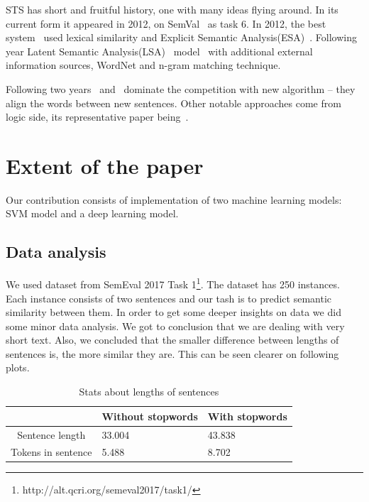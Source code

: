 \documentclass[10pt, a4paper]{article}
\begin{document}
STS has short and fruitful history, one with many ideas flying around. In its current form it appeared in 2012, on SemVal~\citep{agirre2012semeval} as task 6.  In 2012, the best system~\citep{bar2012ukp} used lexical similarity and Explicit Semantic Analysis(ESA)~\citep{gabrilovich2007computing}. Following year Latent Semantic Analysis(LSA)~\citep{deerwester1990indexing} model~\citep{han2013umbc} with additional external information sources, WordNet and n-gram matching technique.

Following two years~\citep{sultan2014dls} and~\citep{sultan2015dls} dominate the competition with new algorithm -- they align the words between new sentences. Other notable approaches come from logic side, its representative paper being~\citep{beltagy2014probabilistic}.

\section{Extent of the paper}

Our contribution consists of implementation of two machine learning models: SVM model and a deep learning model.

\subsection{Data analysis}
We used dataset from SemEval 2017 
Task 1\footnote{http://alt.qcri.org/semeval2017/task1/}. 
The dataset has 250 instances. Each instance consists of two sentences and our tash is to predict semantic similarity between them. In order to get some deeper insights on data we did some minor data analysis. We got to conclusion that we are dealing with very short text. Also, we concluded that the smaller difference between lengths of sentences is, the more similar they are. This can be seen clearer on following plots.

\begin{table}
\caption{Stats about lengths of sentences}
\label{tab:narrow-table}
\begin{center}
\begin{tabular}{cll}
\toprule
& Without stopwords & With stopwords \\
\midrule
Sentence length & 33.004 & 43.838 \\
Tokens in sentence & 5.488 & 8.702 \\
\bottomrule
\end{tabular}
\end{center}
\end{table}
\end{document}
